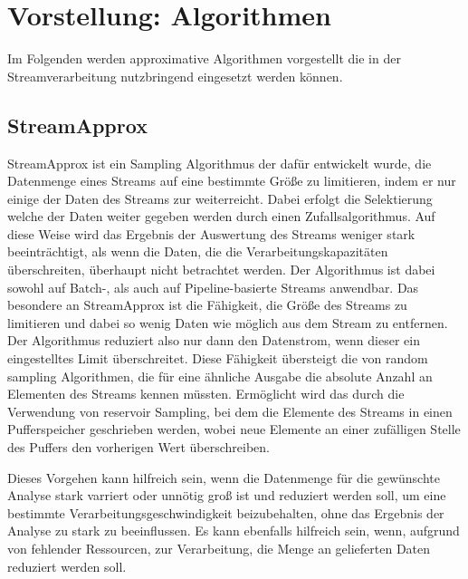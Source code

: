 \section{Vorstellung: Algorithmen}
Im Folgenden werden approximative Algorithmen vorgestellt die in der Streamverarbeitung nutzbringend eingesetzt werden können.

\subsection{StreamApprox}
StreamApprox ist ein Sampling Algorithmus der dafür entwickelt wurde, 
die Datenmenge eines Streams auf eine bestimmte Größe zu limitieren, 
indem er nur einige der Daten des Streams zur weiterreicht. 
Dabei erfolgt die Selektierung welche der Daten weiter gegeben werden durch einen Zufallsalgorithmus. 
Auf diese Weise wird das Ergebnis der Auswertung des Streams weniger stark beeinträchtigt, 
als wenn die Daten, die die Verarbeitungskapazitäten überschreiten, 
überhaupt nicht betrachtet werden. 
Der Algorithmus ist dabei sowohl auf Batch-, als auch auf Pipeline-basierte Streams anwendbar.
Das besondere an StreamApprox ist die Fähigkeit, 
die Größe des Streams zu limitieren und dabei so wenig Daten wie möglich aus dem Stream zu entfernen. 
Der Algorithmus reduziert also nur dann den Datenstrom, wenn dieser ein eingestelltes Limit überschreitet. 
Diese Fähigkeit übersteigt die von random sampling Algorithmen, 
die für eine ähnliche Ausgabe die absolute Anzahl an Elementen des Streams kennen müssten. 
Ermöglicht wird das durch die Verwendung von reservoir Sampling, 
bei dem die Elemente des Streams in einen Pufferspeicher geschrieben werden, 
wobei neue Elemente an einer zufälligen Stelle des Puffers den vorherigen Wert überschreiben. \cite{quoc2017} 

Dieses Vorgehen kann hilfreich sein, 
wenn die Datenmenge für die gewünschte Analyse stark varriert oder unnötig groß ist und reduziert werden soll, 
um eine bestimmte Verarbeitungsgeschwindigkeit beizubehalten, 
ohne das Ergebnis der Analyse zu stark zu beeinflussen.
Es kann ebenfalls hilfreich sein, 
wenn, aufgrund von fehlender Ressourcen, zur Verarbeitung, die Menge an gelieferten Daten reduziert werden soll.
